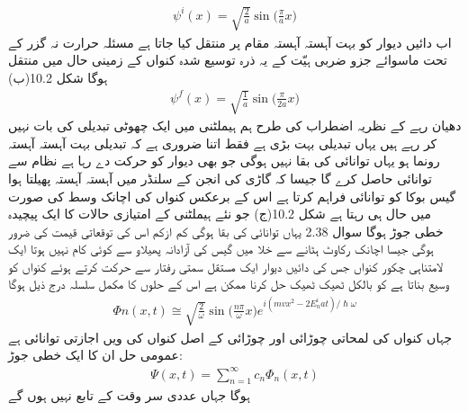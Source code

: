 \begin{align}
\psi^i (x) = \sqrt{\frac{2}{a}} \sin \big ( \frac{\pi}{a} x \big )
\end{align}
 اب دائیں  دیوار کو بہت آہستہ آہستہ مقام  پر منتقل کیا جاتا ہے مسئلہ حرارت نہ گزر کے تحت ماسوائے جزو ضربی ہیّت کے یہ ذرہ توسیع شدہ کنواں کے زمینی حال میں منتقل ہوگا شکل 10.2(ب) 
\begin{align}
\psi^f (x) = \sqrt{\frac{1}{a}} \sin \big ( \frac{\pi}{2a} x \big )
\end{align}
دھیان رہے کے نظریہ اضطراب کی طرح ہم ہيملٹنی میں ایک چھوٹی تبدیلی کی بات نہیں کر رہے ہیں یہاں تبدیلی بہت بڑی ہے فقط اتنا ضروری ہے کہ تبدیلی بہت آہستہ آہستہ رونما ہو یہاں توانائی کی بقا نہیں ہوگی جو بھی دیوار کو حرکت دے رہا ہے نظام سے توانائی حاصل کرے گا جیسا کہ گاڑی کی انجن کے سلنڈر میں آہستہ آہستہ پھیلتا ہوا گیس بوکا کو توانائی فراہم کرتا ہے اس کے برعکس کنواں کی اچانک وسط کی صورت میں حال  ہی رہتا ہے شکل 10.2(ج) جو نئے ہیملٹنی کے امتیازی حالات کا ایک پیچیدہ خطی جوڑ ہوگا سوال 2.38 یہاں توانائی کی بقا ہوگی کم ازکم اس کی توقعاتی قیمت کی ضرور ہوگی جیسا اچانک رکاوٹ ہٹانے سے خلا میں گیس کی آزادانہ پھیلاو سے کوئی کام نہیں ہوتا 
ایک لامتناہی چکور کنواں جس کی دائیں دیوار ایک مستقل سمتی رفتار  سے حرکت کرتے ہوئے کنواں کو وسیع بناتا ہے کو بالکل ٹھیک ٹھیک حل کرنا ممکن ہے اس کے حلوں کا مکمل سلسلہ درج ذیل ہوگا 
\begin{align}
\Phi n (x, t) \cong \sqrt{\frac{2}{\omega}} \sin \big ( \frac{n \pi}{\omega} x \big ) e^{i(mvx^2 -2E_n^i at)/\hslash \omega}
\end{align}
جہاں  کنواں کی لمحاتی چوڑائی اور چوڑائی  کے اصل کنواں کی  ویں اجازتی توانائی  ہے عمومی حل ان  کا ایک خطی جوڑ:
\begin{align}
\Psi (x, t) = \sum_{n = 1}^{\infty} c_n \Phi_n (x, t)
\end{align}
ہوگا جہاں عددی سر  وقت  کے تابع نہیں ہوں گے 
